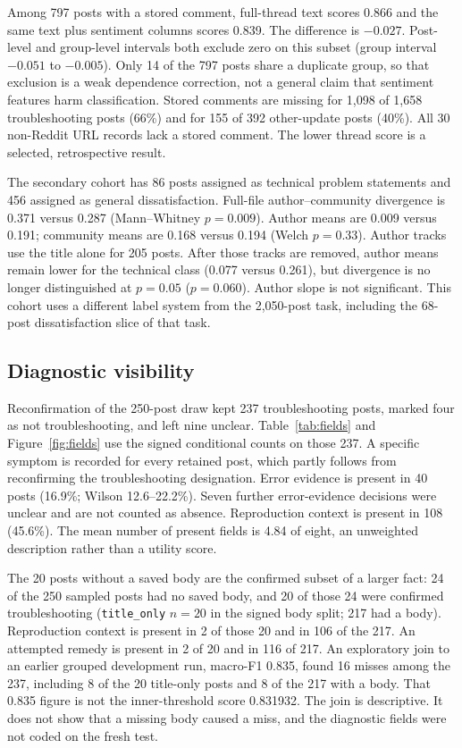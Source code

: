 \documentclass[conference,letterpaper]{IEEEtran}
\begin{document}
Among 797 posts with a stored comment, full-thread text scores 0.866 and the same text plus sentiment columns scores 0.839. The difference is $-0.027$. Post-level and group-level intervals both exclude zero on this subset (group interval $-0.051$ to $-0.005$). Only 14 of the 797 posts share a duplicate group, so that exclusion is a weak dependence correction, not a general claim that sentiment features harm classification. Stored comments are missing for 1,098 of 1,658 troubleshooting posts (66\%) and for 155 of 392 other-update posts (40\%). All 30 non-Reddit URL records lack a stored comment. The lower thread score is a selected, retrospective result.

The secondary cohort has 86 posts assigned as technical problem statements and 456 assigned as general dissatisfaction. Full-file author--community divergence is 0.371 versus 0.287 (Mann--Whitney $p=0.009$). Author means are 0.009 versus 0.191; community means are 0.168 versus 0.194 (Welch $p=0.33$). Author tracks use the title alone for 205 posts. After those tracks are removed, author means remain lower for the technical class (0.077 versus 0.261), but divergence is no longer distinguished at $p=0.05$ ($p=0.060$). Author slope is not significant. This cohort uses a different label system from the 2,050-post task, including the 68-post dissatisfaction slice of that task.

\subsection{Diagnostic visibility}
Reconfirmation of the 250-post draw kept 237 troubleshooting posts, marked four as not troubleshooting, and left nine unclear. Table~\ref{tab:fields} and Figure~\ref{fig:fields} use the signed conditional counts on those 237. A specific symptom is recorded for every retained post, which partly follows from reconfirming the troubleshooting designation. Error evidence is present in 40 posts (16.9\%; Wilson 12.6--22.2\%). Seven further error-evidence decisions were unclear and are not counted as absence. Reproduction context is present in 108 (45.6\%). The mean number of present fields is 4.84 of eight, an unweighted description rather than a utility score.

The 20 posts without a saved body are the confirmed subset of a larger fact: 24 of the 250 sampled posts had no saved body, and 20 of those 24 were confirmed troubleshooting (\texttt{title\_only} $n=20$ in the signed body split; 217 had a body). Reproduction context is present in 2 of those 20 and in 106 of the 217. An attempted remedy is present in 2 of 20 and in 116 of 217. An exploratory join to an earlier grouped development run, macro-F1 0.835, found 16 misses among the 237, including 8 of the 20 title-only posts and 8 of the 217 with a body. That 0.835 figure is not the inner-threshold score 0.831932. The join is descriptive. It does not show that a missing body caused a miss, and the diagnostic fields were not coded on the fresh test.
\end{document}
